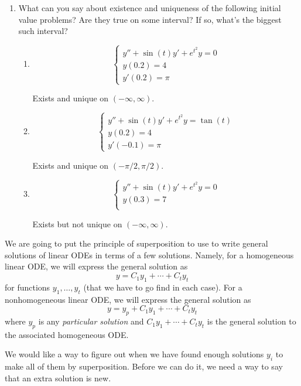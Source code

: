 \documentclass[12pt]{amsart}
\numberwithin{equation}{section}
\theoremstyle{plain} %
\theoremstyle{definition}
\theoremstyle{remark}
\begin{document}
\begin{enumerate}
\item What can you say about existence and uniqueness of the following initial value problems? Are they true on some interval? If so, what's the biggest such interval?
\begin{enumerate}
\item \[ \begin{cases} y'' + \sin(t) y' + e^{t^2} y = 0 \\ 
y(0.2) = 4 \\
y'(0.2) = \pi
\end{cases}\]
\begin{framed}
Exists and unique on $(-\infty,\infty)$.
\end{framed}
\item \[ \begin{cases} y'' + \sin(t) y' + e^{t^2} y = \tan(t) \\ 
y(0.2) = 4 \\
y'(-0.1) = \pi
\end{cases}\]
\begin{framed}
Exists and unique on $(-\pi/2,\pi/2)$.
\end{framed}
\item \[ \begin{cases} y'' + \sin(t) y' + e^{t^2} y = 0 \\ 
y(0.3) = 7 \\
\end{cases}\]
\begin{framed}
Exists but not unique on  $(-\infty,\infty)$.
\end{framed}
\end{enumerate}
\end{enumerate}

We are going to put the principle of superposition to use to write general solutions of linear ODEs in terms of a few solutions. Namely, for a homogeneous linear ODE, we will express the general solution as
\[ y = C_1 y_1 + \cdots + C_t y_t\]
for functions $y_1,\dots,y_t$ (that we have to go find in each case).
For a nonhomogeneous linear ODE, we will express the general solution as
\[ y = y_p + C_1 y_1 + \cdots + C_t y_t\]
where $y_p$ is any \emph{particular solution} and $C_1 y_1 + \cdots + C_t y_t$ is the general solution to the associated homogeneous ODE.

We would like a way to figure out when we have found enough solutions $y_i$ to make all of them by superposition. Before we can do it, we need a way to say that an extra solution is new.
\end{document}
